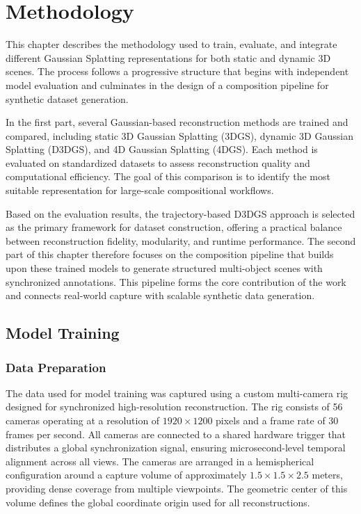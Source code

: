 

\chapter{Methodology}

This chapter describes the methodology used to train, evaluate, and integrate different Gaussian Splatting representations for both static and dynamic 3D scenes. 
The process follows a progressive structure that begins with independent model evaluation and culminates in the design of a composition pipeline for synthetic dataset generation. 

In the first part, several Gaussian-based reconstruction methods are trained and compared, including static 3D Gaussian Splatting (3DGS), dynamic 3D Gaussian Splatting (D3DGS), and 4D Gaussian Splatting (4DGS). 
Each method is evaluated on standardized datasets to assess reconstruction quality and computational efficiency. 
The goal of this comparison is to identify the most suitable representation for large-scale compositional workflows.

Based on the evaluation results, the trajectory-based D3DGS approach is selected as the primary framework for dataset construction, offering a practical balance between reconstruction fidelity, modularity, and runtime performance. 
The second part of this chapter therefore focuses on the composition pipeline that builds upon these trained models to generate structured multi-object scenes with synchronized annotations. 
This pipeline forms the core contribution of the work and connects real-world capture with scalable synthetic data generation.

\section{Model Training}
\label{sec:modeltraining}

\subsection{Data Preparation}
\label{sec:data_preparation}

The data used for model training was captured using a custom multi-camera rig designed for synchronized high-resolution reconstruction. 
The rig consists of 56 cameras operating at a resolution of \(1920 \times 1200\) pixels and a frame rate of 30 frames per second. 
All cameras are connected to a shared hardware trigger that distributes a global synchronization signal, ensuring microsecond-level temporal alignment across all views.
The cameras are arranged in a hemispherical configuration around a capture volume of approximately \(1.5 \times 1.5 \times 2.5\) meters, providing dense coverage from multiple viewpoints. 
The geometric center of this volume defines the global coordinate origin used for all reconstructions.

